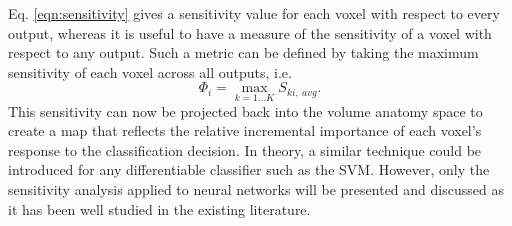 \documentclass[5p,authoryear]{elsarticle}
\begin{document}
Eq. \ref{eqn:sensitivity} gives a sensitivity value for each voxel with respect to every output, whereas it is useful to have a measure of the sensitivity of a voxel with respect to any output.
Such a metric can be defined by taking the maximum sensitivity of each voxel across all outputs, i.e.
\begin{equation}
\Phi_{i} = \max_{k=1 \dots K}{S_{ki,~avg}}.
\end{equation}
This sensitivity can now be projected back into the volume anatomy space to create a  map that reflects the relative incremental importance of each voxel's response to the classification decision.
In theory, a similar technique could be introduced for any differentiable classifier such as the SVM.
However, only the sensitivity analysis applied to neural networks will be presented and discussed as it has been well studied in the existing literature.
\end{document}
